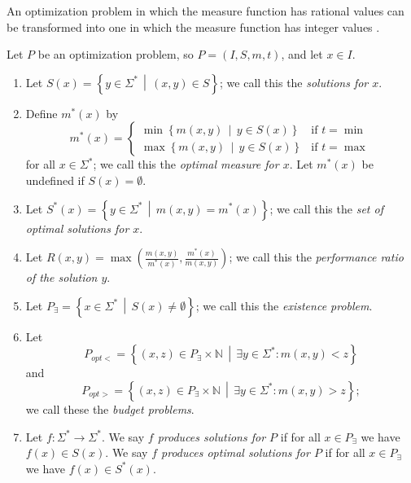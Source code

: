 An optimization problem in which the measure function has rational values can be transformed into one in which the measure function has integer values \cite[page~23]{acgkmp99}.

\begin{definition}
  Let $P$ be an optimization problem, so $P = (I, S, m, t)$, and let $x \in I$.
  \begin{enumerate}
  \item Let $S(x)=\left\{ y \in \Sigma^* \,\middle|\, (x, y) \in S \right\}$; we call this the \emph{solutions for $x$}.
  \item Define $m^*(x)$ by
    \begin{displaymath}
      m^*(x) =
      \begin{cases}
        \min \left\{ m(x, y) \,\middle|\, y \in S(x) \right\} & \text{if } t = \min \\
        \max \left\{ m(x, y) \,\middle|\, y \in S(x) \right\} & \text{if } t = \max
      \end{cases}
    \end{displaymath}
    for all $x \in \Sigma^*$; we call this the \emph{optimal measure for $x$}.
    Let $m^*(x)$ be undefined if $S(x) = \emptyset$.
  \item Let $S^*(x) = \left\{ y \in \Sigma^* \,\middle|\, m(x, y) = m^*(x) \right\}$; we call this the \emph{set of optimal solutions for $x$}.
  \item Let $R(x, y) = \max \left(\frac{m(x, y)}{m^*(x)}, \frac{m^*(x)}{m(x, y)}\right)$; we call this the \emph{performance ratio of the solution $y$}.
  \item Let $P_\exists = \left\{ x \in \Sigma^* \,\middle|\, S(x) \neq \emptyset \right\}$; we call this the \emph{existence problem}.
  \item Let
    \begin{displaymath}
      P_{opt<} = \left\{ (x, z) \in P_\exists \times \mathbb{N} \,\middle|\, \exists y \in \Sigma^* \colon m(x, y) < z \right\}
    \end{displaymath}
    and
    \begin{displaymath}
      P_{opt>}=\left\{ (x, z) \in P_\exists \times \mathbb{N} \,\middle|\, \exists y \in \Sigma^* \colon m(x, y) > z \right\};
    \end{displaymath}
    we call these the \emph{budget problems}.
  \item Let $f \colon \Sigma^* \to \Sigma^*$.
    We say \emph{$f$ produces solutions for $P$} if for all $x \in P_\exists$ we have $f(x) \in S(x)$.
    We say \emph{$f$ produces optimal solutions for $P$} if for all $x \in P_\exists$ we have $f(x) \in S^*(x)$.
  \end{enumerate}
\end{definition}

